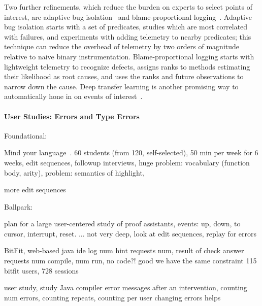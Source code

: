 \documentclass[english,submission,cleveref]{programming}
\begin{document}
Two further refinements, which reduce the burden on experts to
select points of interest, are adaptive bug isolation~\cite{nl-icse-2010}
and blame-proportional logging~\cite{lnsmc-usenix-2018}.
Adaptive bug isolation starts with a set of predicates, studies which are
most correlated with failures, and experiments with adding telemetry to nearby
predicates; this technique can reduce the overhead of telemetry by two orders
of magnitude relative to naive binary instrumentation.
Blame-proportional logging starts with lightweight telemetry to recognize
defects, assigns ranks to methods estimating their likelihood as root causes,
and uses the ranks and future observations to narrow down the cause.
Deep transfer learning is another promising way to automatically hone in on events of
interest~\cite{zfstt-ieeesensors-2022}.




\paragraph{User Studies: Errors and Type Errors}

Foundational:

Mind your language~\cite{mfk-onward-2011}.
60 students (from 120, self-selected),
50 min per week for 6 weeks,
edit sequences,
followup interviews,
huge problem: vocabulary (function body, arity),
problem: semantics of highlight,

\cite{wk-koli-2020,lgk-pj-2022,mcpcspss-abz-2020}
more edit sequences


Ballpark:

\cite{t-hatra-2021}
plan for a large user-centered study of proof assistants,
events: up, down, to cursor, interrupt, reset.
... not very deep, look at edit sequences, replay for errors

\cite{anna-russo-kennedy-ms-2006}
BitFit, web-based java ide log num hint requests num, result of check answer
requests num compile, num run, no code?! good we have the same constraint
115 bitfit users, 728 sessions

\cite{bgimgm-cse-2016}
user study,
study Java compiler error messages after an intervention, counting num errors,
counting repeats, counting per user
changing errors helps
\end{document}
